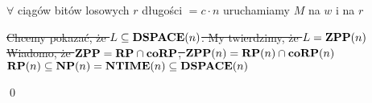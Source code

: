 $\forall$ ciągów bitów losowych $r$ długości $= c \cdot n$ uruchamiamy $M$ na $w$ i na $r$

\sout{Chcemy pokazać, że $L \subseteq \textbf{DSPACE}(n)$.
My twierdzimy, że $L = \textbf{ZPP}(n)$
Wiadomo, że $\textbf{ZPP} = \textbf{RP} \cap \textbf{co}\textbf{RP}$, $\textbf{ZPP}(n) = \textbf{RP}(n) \cap \textbf{co}\textbf{RP}(n)$
$\textbf{RP}(n) \subseteq \textbf{NP}(n) = \textbf{NTIME}(n) \subseteq \textbf{DSPACE}(n)$}

\qed


\iffalse
\subsection{Problem 3}
Udowodnij, że następujący problem jest $\NP$-zupełny: dany alfabet $\Sigma$, niedeterministyczny automat skończony $A$ nad $\Sigma$ oraz liczba naturalna $n$ zapisana unarnie, czy istnieje słowo długości $n$ odrzucane przez automat $A$?
\fi